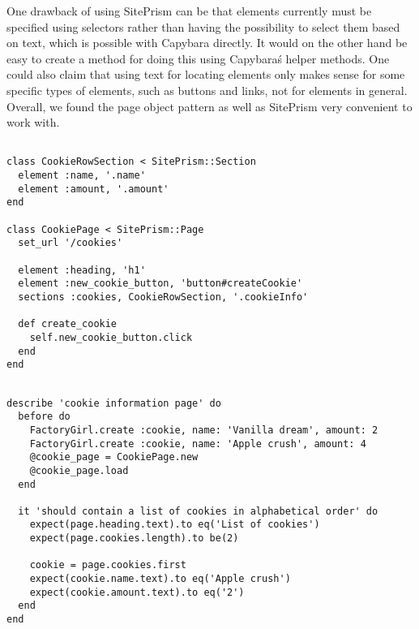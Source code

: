One drawback of using SitePrism can be that elements currently must be
specified using selectors rather than having the possibility to select
them based on text, which is possible with Capybara directly. It would
on the other hand be easy to create a method for doing this using
Capybara\'s helper methods. One could also claim that using text for
locating elements only makes sense for some specific types of elements,
such as buttons and links, not for elements in general.\\

Overall, we found the page object pattern as well as SitePrism very
convenient to work with.\\

\begin{lstlisting}[caption=Page definition for a page with a list of cookie information.,
                   label=lst:siteprism_page, float=t]

class CookieRowSection < SitePrism::Section
  element :name, '.name'
  element :amount, '.amount'
end

class CookiePage < SitePrism::Page
  set_url '/cookies'

  element :heading, 'h1'
  element :new_cookie_button, 'button#createCookie'
  sections :cookies, CookieRowSection, '.cookieInfo'

  def create_cookie
    self.new_cookie_button.click
  end
end

\end{lstlisting}

\begin{lstlisting}[caption=Browser test using SitePrism a page object defined in
                           code listing \ref{lst:siteprism_page}.,
                   label=lst:siteprism_test, float=t]

describe 'cookie information page' do
  before do
    FactoryGirl.create :cookie, name: 'Vanilla dream', amount: 2
    FactoryGirl.create :cookie, name: 'Apple crush', amount: 4
    @cookie_page = CookiePage.new
    @cookie_page.load
  end

  it 'should contain a list of cookies in alphabetical order' do
    expect(page.heading.text).to eq('List of cookies')
    expect(page.cookies.length).to be(2)

    cookie = page.cookies.first
    expect(cookie.name.text).to eq('Apple crush')
    expect(cookie.amount.text).to eq('2')
  end
end

\end{lstlisting}
